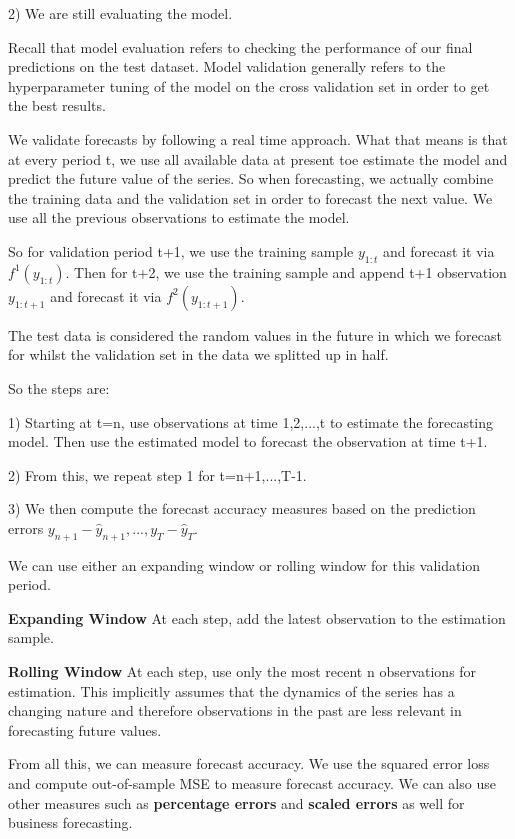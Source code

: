 \documentclass[11pt, oneside]{article}
\theoremstyle{definition}
\begin{document}
2) We are still evaluating the model.

Recall that model evaluation refers to checking the performance of our final predictions on the test dataset. Model validation generally refers to the hyperparameter tuning of the model on the cross validation set in order to get the best results.

We validate forecasts by following a real time approach. What that means is that at every period t, we use all available data at present toe estimate the model and predict the future value of the series. So when forecasting, we actually combine the training data and the validation set in order to forecast the next value. We use all the previous observations to estimate the model.

So for validation period t+1, we use the training sample $y_{1:t}$ and forecast it via $f^{1}(y_{1:t})$. Then for t+2, we use the training sample and append t+1 observation  $y_{1:t+1}$ and forecast it via $f^{2}(y_{1:t+1})$.

The test data is considered the random values in the future in which we forecast for whilst the validation set in the data we splitted up in half.

So the steps are:

1) Starting at t=n, use observations at time 1,2,...,t to estimate the forecasting model. Then use the estimated model to forecast the observation at time t+1.

2) From this, we repeat step 1 for t=n+1,...,T-1.

3) We then compute the forecast accuracy measures based on the prediction errors $y_{n+1} - \hat{y}_{n+1},...,y_T - \hat{y}_T$.

We can use either an expanding window or rolling window for this validation period.

\textbf{Expanding Window} At each step, add the latest observation to the estimation sample.

\textbf{Rolling Window} At each step, use only the most recent n observations for estimation. This implicitly assumes that the dynamics of the series has a changing nature and therefore observations in the past are less relevant in forecasting future values.

From all this, we can measure forecast accuracy. We use the squared error loss and compute out-of-sample MSE to measure forecast accuracy. We can also use other measures such as \textbf{percentage errors} and \textbf{scaled errors} as well for business forecasting.
\end{document}
